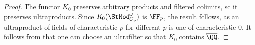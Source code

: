 \documentclass[12pt,oneside]{article}
\newcounter{counter}
\newtheorem{lem}[counter]{Lemma}
\begin{document}
	\begin{proof}
		The functor $K_0$ preserves arbitrary products
		 and filtered colimits, so it preserves ultraproducts. Since $K_0(\StMod^{\omega}_{C_p})$ is $\FF_p$, the result follows, as an ultraproduct of fields of characteristic $p$ for different $p$ is one of characteristic $0$. It follows from \cite[Theorem 5]{ax1967solving} that one can choose an ultrafilter so that $K_0$ contains $\overline{\QQ}$.
	\end{proof}
%
%
%	
\end{document}
